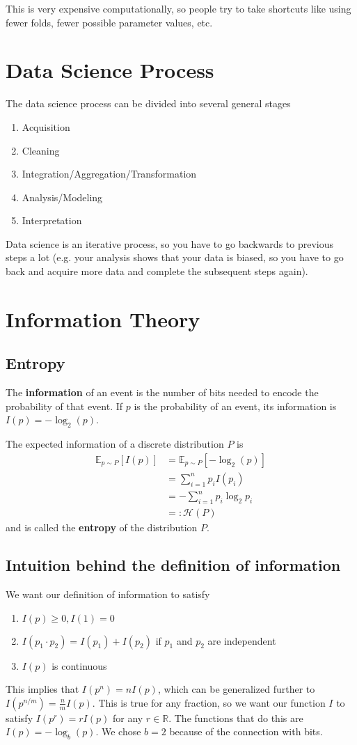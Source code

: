 \documentclass{article}
\begin{document}
This is very expensive computationally, so people try to take shortcuts like using fewer folds, fewer possible parameter values, etc.

\section{Data Science Process}
The data science process can be divided into several general stages
\begin{enumerate}
	\item Acquisition
	\item Cleaning
	\item Integration/Aggregation/Transformation
	\item Analysis/Modeling
	\item Interpretation
\end{enumerate}
Data science is an iterative process, so you have to go backwards to previous steps a lot (e.g. your analysis shows that your data is biased, so you have to go back and acquire more data and complete the subsequent steps again).

\section{Information Theory}

\subsection{Entropy}
The \textbf{information} of an event is the number of bits needed to encode the probability of that event. If $p$ is the probability of an event, its information is $I(p)=-\log_2(p)$.

The expected information of a discrete distribution $P$ is
\begin{align*}
	\mathbb{E}_{p\sim P} [I(p)] &= \mathbb{E}_{p\sim P} \left[ -\log_2(p) \right] \\
				    &= \sum_{i=1}^n p_i I(p_i) \\
				    &= - \sum_{i=1}^n p_i \log_2 p_i \\
				    &=: \mathcal{H}(P)
\end{align*}
and is called the \textbf{entropy} of the distribution $P$.

\subsection{Intuition behind the definition of information}
We want our definition of information to satisfy
\begin{enumerate}
	\item $I(p) \geq 0, I(1) = 0$
	\item $I(p_1 \cdot p_2) = I(p_1) + I(p_2)$ if $p_1$ and $p_2$ are independent
	\item $I(p)$ is continuous
\end{enumerate}
This implies that $I(p^n) = n I(p)$, which can be generalized further to $I(p^{n/m}) = \frac{n}{m} I(p)$. This is true for any fraction, so we want our function $I$ to satisfy $I(p^r) = r I(p)$ for any $r \in \mathbb{R}$. The functions that do this are $I(p) = -\log_b(p)$. We chose $b=2$ because of the connection with bits.
\end{document}
